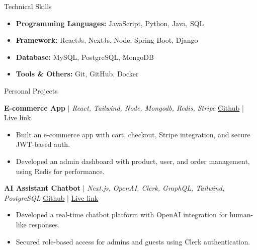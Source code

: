 \documentclass{resume} %
\begin{document}
{\vspace{-0.18cm}
\begin{rSection}{Technical Skills}
\begin{itemize}[leftmargin=0.4cm, label={\Large \textbullet}]
    \justifying
    \setlength\itemsep{-0.15cm}
    \item \textbf{Programming Languages:} JavaScript, Python, Java, SQL
    \item \textbf{Framework:} ReactJs, NextJs, Node, Spring Boot, Django
    \item \textbf{Database:} MySQL, PostgreSQL, MongoDB
    \item \textbf{Tools \& Others:} Git, GitHub, Docker
\end{itemize}
\end{rSection}
\vspace{-0.18cm}

\vspace{-0.18cm}
\begin{rSection}{Personal Projects}

{\textbf{E-commerce App}} $|$ \emph{React, Tailwind, Node, Mongodb, Redis, Stripe}
\hfill{\href{https://github.com/smRid/E-commerce-store-mern}{Github}} | {\href{https://shopzi.onrender.com/}{Live link}}
    \vspace{-0.2cm}
    \begin{itemize}[leftmargin=0.4cm, label={\Large \textbullet}]
    \justifying
        \setlength\itemsep{-0.2cm}
        \item Built an e-commerce app with cart, checkout, Stripe integration, and secure JWT-based auth.
        \item Developed an admin dashboard with product, user, and order management, using Redis for performance.
    \end{itemize}

{\textbf{AI Assistant Chatbot}} $|$ \emph{Next.js, OpenAI, Clerk, GraphQL, Tailwind, PostgreSQL}
\hfill{\href{https://github.com/smRid/AI-Assistant-Chat-Bot}{Github}} | {\href{https://aidlybot.vercel.app/}{Live link}}
    \vspace{-0.2cm}
    \begin{itemize}[leftmargin=0.4cm, label={\Large \textbullet}]
    \justifying
        \setlength\itemsep{-0.2cm}
        \item Developed a real-time chatbot platform with OpenAI integration for human-like responses.
        \item Secured role-based access for admins and guests using Clerk authentication.
    \end{itemize}


\end{rSection}}
\end{document}
